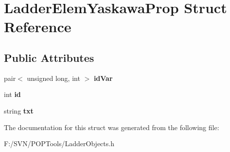 \hypertarget{struct_ladder_elem_yaskawa_prop}{\section{Ladder\-Elem\-Yaskawa\-Prop Struct Reference}
\label{struct_ladder_elem_yaskawa_prop}
}
\subsection*{Public Attributes}
\begin{DoxyCompactItemize}
\item 
\hypertarget{struct_ladder_elem_yaskawa_prop_a4f62c33ac2edc24466ca431a636e3704}{pair$<$ unsigned long, int $>$ {\bfseries id\-Var}}\label{struct_ladder_elem_yaskawa_prop_a4f62c33ac2edc24466ca431a636e3704}

\item 
\hypertarget{struct_ladder_elem_yaskawa_prop_ab36d0e6e81bf6ddf47b0d410de4fc7c5}{int {\bfseries id}}\label{struct_ladder_elem_yaskawa_prop_ab36d0e6e81bf6ddf47b0d410de4fc7c5}

\item 
\hypertarget{struct_ladder_elem_yaskawa_prop_acbe03ef17b6b1e664e63de2665bb2175}{string {\bfseries txt}}\label{struct_ladder_elem_yaskawa_prop_acbe03ef17b6b1e664e63de2665bb2175}

\end{DoxyCompactItemize}


The documentation for this struct was generated from the following file\-:\begin{DoxyCompactItemize}
\item 
F\-:/\-S\-V\-N/\-P\-O\-P\-Tools/Ladder\-Objects.\-h\end{DoxyCompactItemize}
